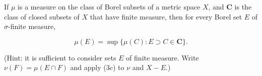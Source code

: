 If $\mu$ is a measure on the class of Borel subsets of a metric space $X$, and $\mathbf{C}$ is the class of closed subsets of $X$ that have finite measure, then for every Borel set $E$ of $\sigma$-finite measure,

$$\mu(E) = \sup \{ \mu(C): E \supset C \in \mathbf{C} \}.$$

(Hint: it is sufficient to consider sets $E$ of finite measure. Write $\nu(F) = \mu(E \cap F)$ and apply (3c) to $\nu$ and $X - E$.)
